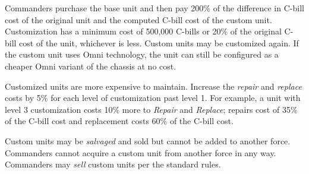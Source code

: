 Commanders purchase the base unit and then pay 200\% of the difference in C-bill cost of the original unit and the computed C-bill cost of the custom unit.
Customization has a minimum cost of 500,000 C-bills or 20\% of the original C-bill cost of the unit, whichever is less.
Custom units may be customized again.
If the custom unit uses Omni technology, the unit can still be configured as a cheaper Omni variant of the chassis at no cost.

Customized units are more expensive to maintain.
Increase the \emph{repair} and \emph{replace} costs by 5\% for each level of customization past level 1.
For example, a unit with level 3 customization costs 10\% more to \emph{Repair} and \emph{Replace}; repairs cost of 35\% of the C-bill cost and replacement costs 60\% of the C-bill cost.

Custom units may be \emph{salvaged} and sold but cannot be added to another force.
Commanders cannot acquire a custom unit from another force in any way.
Commanders may \emph{sell} custom units per the standard rules.
